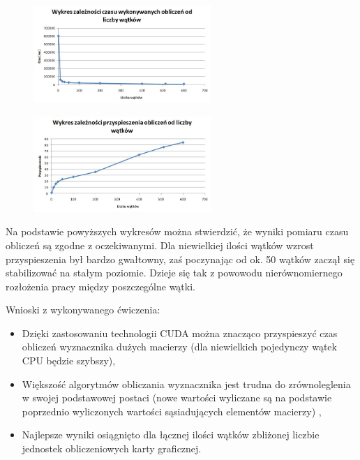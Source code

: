 \documentclass[a4paper,12pt]{article}
\newenvironment{lista}{
\begin{itemize}
  \setlength{\itemsep}{1pt}
  \setlength{\parskip}{0pt}
  \setlength{\parsep}{0pt}
}{\end{itemize}}
\begin{document}
\begin{figure}[!h]
	\centering
  \includegraphics[width=0.6\textwidth]{1.jpg}
\end{figure}

\begin{figure}[!h]
	\centering
  \includegraphics[width=0.6\textwidth]{2.jpg}
\end{figure}

\vspace{10cm}
Na podstawie powyższych wykresów można stwierdzić, że wyniki pomiaru czasu obliczeń są zgodne z oczekiwanymi. Dla niewielkiej ilości wątków wzrost przyspieszenia był bardzo gwałtowny, zaś poczynając od ok. 50 wątków zaczął się stabilizować na stałym poziomie. Dzieje się tak z powowodu nierównomiernego rozłożenia pracy między poszczególne wątki.

\vspace{1cm}
Wnioski z wykonywanego ćwiczenia:
\begin{lista}
\item Dzięki zastosowaniu technologii CUDA można znacząco przyspieszyć czas obliczeń wyznacznika dużych macierzy (dla niewielkich pojedynczy wątek CPU będzie szybszy),
\item Większość algorytmów obliczania wyznacznika jest trudna do zrównoleglenia w swojej podstawowej postaci (nowe wartości wyliczane są na podstawie poprzednio wyliczonych wartości sąsiadujących elementów macierzy) ,
\item Najlepsze wyniki osiągnięto dla łącznej ilości wątków zbliżonej liczbie jednostek obliczeniowych karty graficznej.
\end{lista}
\end{document}
